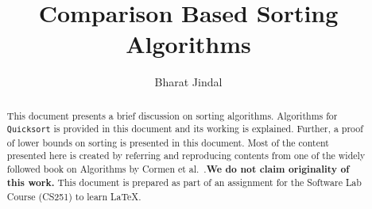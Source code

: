 \documentclass[a4paper, 10pt,twocolumn]{article}
\title{Comparison Based Sorting Algorithms}
\author{Bharat Jindal}
\date{}
\begin{document}
\maketitle

\begin{abstract}
This document presents a brief discussion on sorting algorithms. Algorithms for \texttt{Quicksort} is provided in this document and its working is explained. Further, a proof of lower bounds on sorting is presented in this document. Most of the content presented here is created by referring and reproducing contents from one of the widely followed book on Algorithms by Cormen et al.~\cite{one}.\textbf{We do not claim originality of this work.} This document is prepared as part of an assignment for the Software Lab Course (CS251) to learn \LaTeX.

\noindent {}

\end{abstract}
\end{document}
